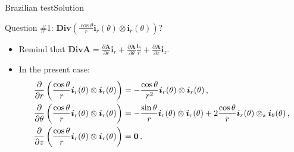 \documentclass{beamer}
\newcommand{\zj}{z}
\newcommand{\Aj}{A}
\newcommand{\Av}{{\boldsymbol\Aj}}
\newcommand{\Div}{\mathbf{Div}}
\renewcommand{\ij}{i}
\newcommand{\iv}{{\boldsymbol\ij}}
\newcommand{\bzero}{{\bf 0}}
\begin{document}
\begin{frame}{Brazilian test}{Solution}

\begin{overprint}

\vskip-20pt
\begin{exampleblock}{Question \#1: $\Div(\frac{\cos\theta}{r}\iv_r(\theta)\otimes\iv_r(\theta))$?}
\begin{itemize}
\item Remind that $\Div\Av=\frac{\partial\Av}{\partial r}\iv_r+\frac{\partial\Av}{\partial\theta}\frac{\iv_\theta}{r}+\frac{\partial\Av}{\partial\zj}\iv_\zj$.
\item In the present case:
{\scriptsize
\begin{displaymath}
\begin{split}
\frac{\partial}{\partial r}\left(\frac{\cos\theta}{r}\iv_r(\theta)\otimes\iv_r(\theta)\right) &=-\frac{\cos\theta}{r^2}\iv_r(\theta)\otimes\iv_r(\theta)\,, \\
\frac{\partial}{\partial\theta}\left(\frac{\cos\theta}{r}\iv_r(\theta)\otimes\iv_r(\theta)\right) &=-\frac{\sin\theta}{r}\iv_r(\theta)\otimes\iv_r(\theta)+2\frac{\cos\theta}{r}\iv_r(\theta)\otimes_s\iv_\theta(\theta)\,, \\
\frac{\partial}{\partial\zj}\left(\frac{\cos\theta}{r}\iv_r(\theta)\otimes\iv_r(\theta)\right) &=\bzero\,.
\end{split}
\end{displaymath}}
\end{itemize}
\end{exampleblock}


\end{overprint}
\end{frame}
\end{document}
